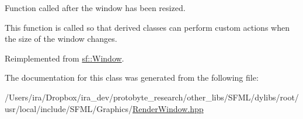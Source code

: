 Function called after the window has been resized. 

This function is called so that derived classes can perform custom actions when the size of the window changes. 

Reimplemented from \hyperlink{classsf_1_1_window_a10f567a387da7b49f417f73321fcf64d}{sf\-::\-Window}.



The documentation for this class was generated from the following file\-:\begin{DoxyCompactItemize}
\item 
/\-Users/ira/\-Dropbox/ira\-\_\-dev/protobyte\-\_\-research/other\-\_\-libs/\-S\-F\-M\-L/dylibs/root/usr/local/include/\-S\-F\-M\-L/\-Graphics/\hyperlink{_render_window_8hpp}{Render\-Window.\-hpp}\end{DoxyCompactItemize}
